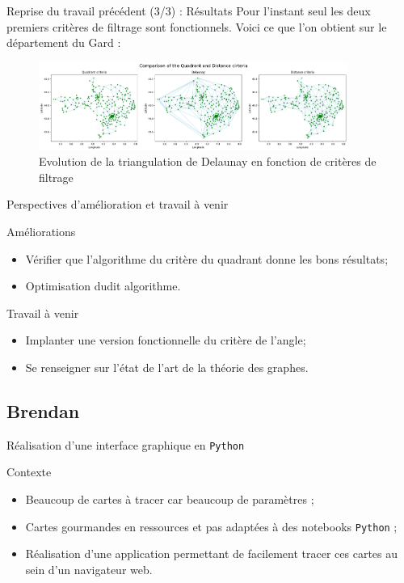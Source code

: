 {\begin{frame}{Reprise du travail précédent (3/3) : Résultats}
    Pour l'instant seul les deux premiers critères de filtrage sont fonctionnels. Voici ce que l'on obtient sur le département du Gard :
    \begin{figure}
        \includegraphics[width=0.9\textwidth]{images/comparaison_criteres.png}
        \caption{\label{fig:comp-crit}Evolution de la triangulation de Delaunay en fonction de critères de filtrage}
    \end{figure}
\end{frame}

\begin{frame}{Perspectives d'amélioration et travail à venir}
    \begin{block}{Améliorations}
        \begin{itemize} 
            \item Vérifier que l'algorithme du critère du quadrant donne les bons résultats;
            \item Optimisation dudit algorithme.
        \end{itemize}
    \end{block}

    \begin{block}{Travail à venir}
        \begin{itemize} 
            \item Implanter une version fonctionnelle du critère de l'angle;
            \item Se renseigner sur l'état de l'art de la théorie des graphes.
        \end{itemize}
    \end{block}
\end{frame}
}




\subsection{Brendan}
\insertsubsectionframe
\begin{frame}{Réalisation d'une interface graphique en \texttt{Python}}
    \begin{block}{Contexte}
        \begin{itemize}
            \item Beaucoup de cartes à tracer car beaucoup de paramètres ;
            \item Cartes gourmandes en ressources et pas adaptées à des notebooks \texttt{Python} ;
            \item Réalisation d'une application permettant de facilement tracer ces cartes au sein d'un navigateur web.
        \end{itemize}
    \end{block}
    
\end{frame}
